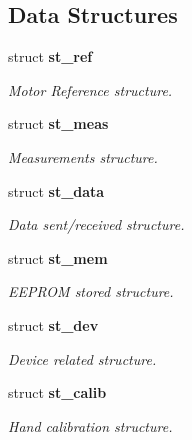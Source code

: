 \subsection*{Data Structures}
\begin{DoxyCompactItemize}
\item 
struct \textbf{ st\+\_\+ref}
\begin{DoxyCompactList}\small\item\em Motor Reference structure. \end{DoxyCompactList}\item 
struct \textbf{ st\+\_\+meas}
\begin{DoxyCompactList}\small\item\em Measurements structure. \end{DoxyCompactList}\item 
struct \textbf{ st\+\_\+data}
\begin{DoxyCompactList}\small\item\em Data sent/received structure. \end{DoxyCompactList}\item 
struct \textbf{ st\+\_\+mem}
\begin{DoxyCompactList}\small\item\em E\+E\+P\+R\+OM stored structure. \end{DoxyCompactList}\item 
struct \textbf{ st\+\_\+dev}
\begin{DoxyCompactList}\small\item\em Device related structure. \end{DoxyCompactList}\item 
struct \textbf{ st\+\_\+calib}
\begin{DoxyCompactList}\small\item\em Hand calibration structure. \end{DoxyCompactList}\end{DoxyCompactItemize}
